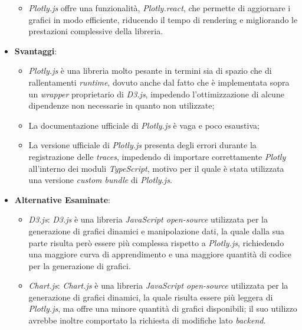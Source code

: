 \begin{itemize}
\begin{itemize}
                  \item \textit{Plotly.js} offre una funzionalità, \textit{Plotly.react}, che permette di aggiornare i grafici in modo efficiente, riducendo il tempo di rendering
                        e migliorando le prestazioni complessive della libreria.
            \end{itemize}
      \item \textbf{Svantaggi}:
            \begin{itemize}
                  \item \textit{Plotly.js} è una libreria molto pesante in termini sia di spazio che di rallentamenti \textit{\gls{runtime}\glox}, dovuto anche dal fatto che è implementata sopra un \textit{wrapper} proprietario di \textit{D3.js},
                        impedendo l'ottimizzazione di alcune dipendenze non necessarie in quanto non utilizzate;
                  \item La documentazione ufficiale di \textit{Plotly.js} è vaga e poco esaustiva;
                  \item La versione ufficiale di \textit{Plotly.js} presenta degli errori durante la registrazione delle \textit{traces}, impedendo di importare correttamente
                        \textit{Plotly} all'interno dei moduli \textit{TypeScript}, motivo per il quale è stata utilizzata una versione \textit{custom bundle} di \textit{Plotly.js}.
            \end{itemize}
      \item \textbf{Alternative Esaminate}:
            \begin{itemize}
                  \item \textit{D3.js}: \textit{D3.js} è una libreria \textit{JavaScript open-source} utilizzata per la generazione di grafici dinamici e manipolazione dati, la quale dalla sua parte risulta però
                        essere più complessa rispetto a \textit{Plotly.js}, richiedendo una maggiore curva di apprendimento e una maggiore quantità di codice per la generazione di grafici.
                  \item \textit{Chart.js}: \textit{Chart.js} è una libreria \textit{JavaScript open-source} utilizzata per la generazione di grafici dinamici, la quale risulta essere più leggera di \textit{Plotly.js},
                        ma offre una minore quantità di grafici disponibili; il suo utilizzo avrebbe inoltre comportato la richiesta di modifiche lato \textit{backend}.
            \end{itemize}
\end{itemize}

